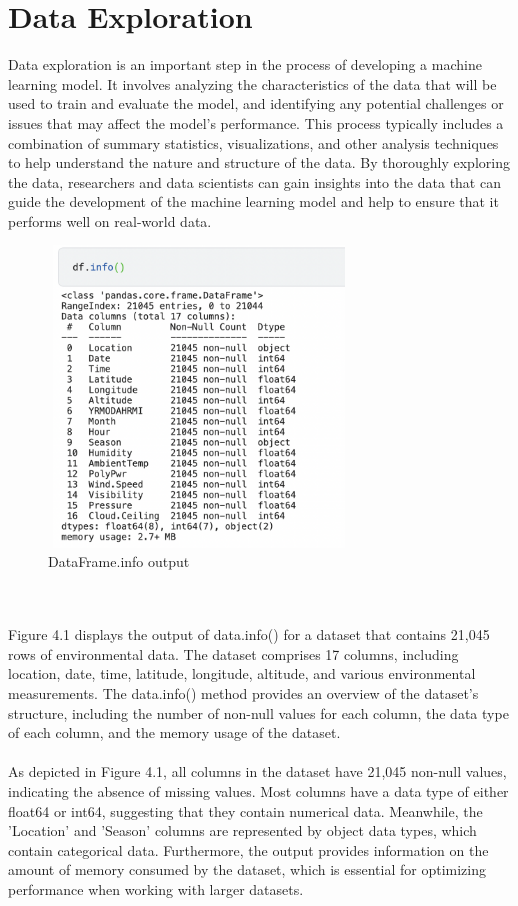 \documentclass{report}
\begin{document}
\section{Data Exploration}
Data exploration is an important step in the process of developing a machine learning model. It involves analyzing the characteristics of the data that will be used to train and evaluate the model, and identifying any potential challenges or issues that may affect the model's performance. This process typically includes a combination of summary statistics, visualizations, and other analysis techniques to help understand the nature and structure of the data. By thoroughly exploring the data, researchers and data scientists can gain insights into the data that can guide the development of the machine learning model and help to ensure that it performs well on real-world data.
\begin{figure}[h!]
  \centering
    \includegraphics[width=8cm, height=8cm] {info.png}
    \caption{DataFrame.info output}
    \label{fig:my_label}
\end{figure}\\
\\
Figure 4.1 displays the output of data.info() for a dataset that contains 21,045 rows of environmental data. The dataset comprises 17 columns, including location, date, time, latitude, longitude, altitude, and various environmental measurements. The data.info() method provides an overview of the dataset's structure, including the number of non-null values for each column, the data type of each column, and the memory usage of the dataset.\\
\\
As depicted in Figure 4.1, all columns in the dataset have 21,045 non-null values, indicating the absence of missing values. Most columns have a data type of either float64 or int64, suggesting that they contain numerical data. Meanwhile, the 'Location' and 'Season' columns are represented by object data types, which contain categorical data. Furthermore, the output provides information on the amount of memory consumed by the dataset, which is essential for optimizing performance when working with larger datasets.
\end{document}
